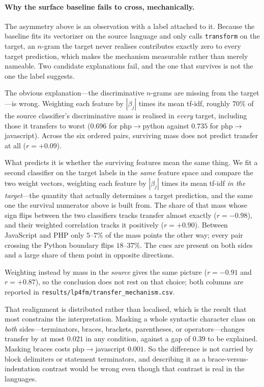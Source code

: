 \paragraph{Why the surface baseline fails to cross, mechanically.} The
asymmetry above is an observation with a label attached to it. Because the
baseline fits its vectorizer on the source language and only calls
\texttt{transform} on the target, an $n$-gram the target never realises
contributes exactly zero to every target prediction, which makes the
mechanism measurable rather than merely nameable. Two candidate explanations
fail, and the one that survives is not the one the label suggests.

The obvious explanation---the discriminative $n$-grams are missing from the
target---is wrong. Weighting each feature by $|\beta_j|$ times its mean
tf-idf, roughly $70\%$ of the source classifier's discriminative mass is
realised in \emph{every} target, including those it transfers to worst
($0.696$ for php$\rightarrow$python against $0.735$ for
php$\rightarrow$javascript). Across the six ordered pairs, surviving mass
does not predict transfer at all ($r = +0.09$).

What predicts it is whether the surviving features mean the same thing. We
fit a second classifier on the target labels in the \emph{same} feature space
and compare the two weight vectors, weighting each feature by
$|\beta_j|$ times its mean tf-idf \emph{in the target}---the quantity that
actually determines a target prediction, and the same one the survival
numerator above is built from. The share of that mass whose sign flips
between the two classifiers tracks transfer almost exactly
($r = -0.98$), and their weighted correlation tracks it positively
($r = +0.90$). Between JavaScript and PHP only $5$--$7\%$ of the mass points
the other way; every pair crossing the Python boundary flips $18$--$37\%$.
The cues are present on both sides and a large share of them point in
opposite directions.

Weighting instead by mass in the \emph{source} gives the same picture
($r = -0.91$ and $r = +0.87$), so the conclusion does not rest on that choice;
both columns are reported in
\texttt{results/lp4fm/transfer\_mechanism.csv}.

That realignment is distributed rather than localised, which is the result
that most constrains the interpretation. Masking a whole syntactic character
class on \emph{both} sides---terminators, braces, brackets, parentheses, or
operators---changes transfer by at most $0.021$ in any condition, against a
gap of $0.39$ to be explained. Masking braces costs php$\rightarrow$javascript
$0.001$. So the difference is not carried by block delimiters or statement
terminators, and describing it as a brace-versus-indentation contrast would
be wrong even though that contrast is real in the languages.

